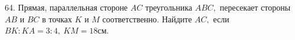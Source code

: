 64. Прямая, параллельная стороне $AC$ треугольника $ABC,$ пересекает стороны $AB$ и $BC$ в точках $K$ и $M$ соответственно. Найдите $AC,$ если $BK:KA=3:4,\ KM=18$см.\\
